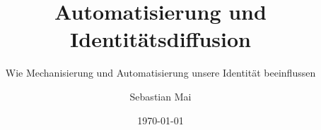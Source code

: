 \documentclass[a4paper,12pt,titlepage]{scrartcl}
\title{Automatisierung und Identitätsdiffusion}
\subtitle{Wie Mechanisierung und Automatisierung unsere Identität beeinflussen}
\author{Sebastian Mai}
\date{\today} %
\begin{document}
\maketitle
\tableofcontents




\newpage
\sloppy
\printbibliography

\end{document}
